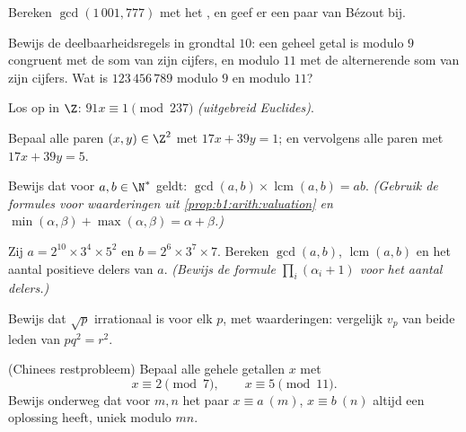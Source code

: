 \begin{exercise}[$\star$]\label{exo:b1:arith:1}
Bereken $\gcd(1\,001, 777)$ met het , en geef er een
paar van Bézout bij.
\end{exercise}

\begin{exercise}[$\star$]\label{exo:b1:arith:2}
Bewijs de deelbaarheidsregels in grondtal $10$: een geheel getal is
modulo $9$ congruent met de som van zijn cijfers, en modulo $11$ met de
alternerende som van zijn cijfers. Wat is $123\,456\,789$ modulo $9$ en
modulo $11$?
\end{exercise}

\begin{exercise}[$\star$]\label{exo:b1:arith:3}
Los op in $\Z$: $91x \equiv 1 \pmod{237}$ \emph{(uitgebreid Euclides)}.
\end{exercise}

\begin{exercise}[$\star$]\label{exo:b1:arith:4}
Bepaal alle paren $(x, y) \in \Z^2$ met $17x + 39y = 1$; en vervolgens
alle paren met $17 x + 39 y = 5$.
\end{exercise}

\begin{exercise}[$\star\star$]\label{exo:b1:arith:5}
Bewijs dat voor $a, b \in \N^*$ geldt: $\gcd(a,b) \times
\operatorname{lcm}(a,b) = ab$. \emph{(Gebruik de formules voor
waarderingen uit \cref{prop:b1:arith:valuation} en $\min(\alpha,\beta) +
\max(\alpha,\beta) = \alpha + \beta$.)}
\end{exercise}

\begin{exercise}[$\star\star$]\label{exo:b1:arith:6}
Zij $a = 2^{10} \times 3^4 \times 5^2$ en $b = 2^6 \times 3^7 \times 7$.
Bereken $\gcd(a, b)$, $\operatorname{lcm}(a,b)$ en het aantal positieve
delers van $a$. \emph{(Bewijs de formule $\prod_i (\alpha_i + 1)$ voor
het aantal delers.)}
\end{exercise}

\begin{exercise}[$\star\star$]\label{exo:b1:arith:7}
Bewijs dat $\sqrt p$ irrationaal is voor elk  $p$, met
waarderingen: vergelijk $v_p$ van beide leden van $p q^2 = r^2$.
\end{exercise}

\begin{exercise}[$\star\star$]\label{exo:b1:arith:8}
(Chinees restprobleem) Bepaal alle gehele getallen $x$ met
\[
x \equiv 2 \pmod 7, \qquad x \equiv 5 \pmod{11}.
\]
Bewijs onderweg dat voor  $m, n$ het paar  $x
\equiv a \ (m)$, $x \equiv b\ (n)$ altijd een oplossing heeft, uniek
modulo $mn$.
\end{exercise}

